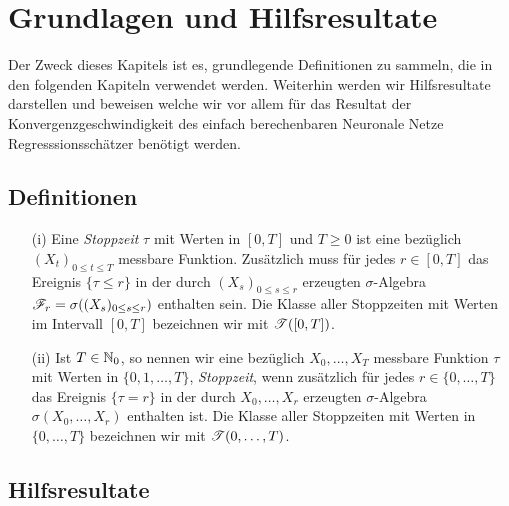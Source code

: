 \chapter{Grundlagen und Hilfsresultate}
\label{chap:1}

Der Zweck dieses Kapitels ist es, grundlegende Definitionen zu sammeln, die in den folgenden Kapiteln verwendet werden. Weiterhin werden wir Hilfsresultate darstellen und beweisen welche wir vor allem für das Resultat der Konvergenzgeschwindigkeit des einfach berechenbaren Neuronale Netze Regresssionsschätzer benötigt werden.

\section{Definitionen}

\begin{defn}\label{def:stop}
    \begin{itemize}
        \item[]
        \item[(i)]Eine \emph{Stoppzeit} $\tau$ mit Werten in $[0,T]$ und $T \geq 0$ ist eine bezüglich $(X_t)_{0\leq t \leq T}$ messbare Funktion. Zusätzlich muss für jedes $r \in [0,T]$ das Ereignis $\{\tau \leq r\}$ in der durch $(X_s)_{0 \leq s \leq r}$ erzeugten  $\sigma$-Algebra $\mathscr{F}_r = \sigma((X_s)_{0 \leq s \leq r})$ enthalten sein. Die Klasse aller Stoppzeiten mit Werten im Intervall $[0,T]$ bezeichnen wir mit $\mathscr{T}([0,T])$.
        \item[(ii)] Ist $T \in \mathbb{N}_0$, so nennen wir eine bezüglich $X_0,\dots,X_T$ messbare Funktion $\tau$ mit Werten in $\{0,1,\dots,T\}$, \emph{Stoppzeit}, wenn zusätzlich für jedes $r \in \{0,\dots,T\}$ das Ereignis $\{\tau = r\}$ in der durch $X_0,\dots,X_r$ erzeugten  $\sigma$-Algebra $\sigma(X_0,\dots,X_r)$ enthalten ist. Die Klasse aller Stoppzeiten mit Werten in $\{0,\dots,T\}$ bezeichnen wir mit $\mathscr{T}(0,\dots,T)$.
    \end{itemize}
\end{defn}

\section{Hilfsresultate}

